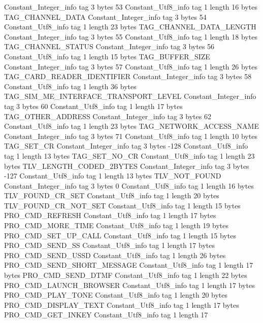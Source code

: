 {{{		}
		Constant_Integer_info {
			tag	3
			bytes	53
		}
		Constant_Utf8_info {
			tag	1
			length	16
			bytes	TAG_CHANNEL_DATA
		}
		Constant_Integer_info {
			tag	3
			bytes	54
		}
		Constant_Utf8_info {
			tag	1
			length	23
			bytes	TAG_CHANNEL_DATA_LENGTH
		}
		Constant_Integer_info {
			tag	3
			bytes	55
		}
		Constant_Utf8_info {
			tag	1
			length	18
			bytes	TAG_CHANNEL_STATUS
		}
		Constant_Integer_info {
			tag	3
			bytes	56
		}
		Constant_Utf8_info {
			tag	1
			length	15
			bytes	TAG_BUFFER_SIZE
		}
		Constant_Integer_info {
			tag	3
			bytes	57
		}
		Constant_Utf8_info {
			tag	1
			length	26
			bytes	TAG_CARD_READER_IDENTIFIER
		}
		Constant_Integer_info {
			tag	3
			bytes	58
		}
		Constant_Utf8_info {
			tag	1
			length	36
			bytes	TAG_SIM_ME_INTERFACE_TRANSPORT_LEVEL
		}
		Constant_Integer_info {
			tag	3
			bytes	60
		}
		Constant_Utf8_info {
			tag	1
			length	17
			bytes	TAG_OTHER_ADDRESS
		}
		Constant_Integer_info {
			tag	3
			bytes	62
		}
		Constant_Utf8_info {
			tag	1
			length	23
			bytes	TAG_NETWORK_ACCESS_NAME
		}
		Constant_Integer_info {
			tag	3
			bytes	71
		}
		Constant_Utf8_info {
			tag	1
			length	10
			bytes	TAG_SET_CR
		}
		Constant_Integer_info {
			tag	3
			bytes	-128
		}
		Constant_Utf8_info {
			tag	1
			length	13
			bytes	TAG_SET_NO_CR
		}
		Constant_Utf8_info {
			tag	1
			length	23
			bytes	TLV_LENGTH_CODED_2BYTES
		}
		Constant_Integer_info {
			tag	3
			bytes	-127
		}
		Constant_Utf8_info {
			tag	1
			length	13
			bytes	TLV_NOT_FOUND
		}
		Constant_Integer_info {
			tag	3
			bytes	0
		}
		Constant_Utf8_info {
			tag	1
			length	16
			bytes	TLV_FOUND_CR_SET
		}
		Constant_Utf8_info {
			tag	1
			length	20
			bytes	TLV_FOUND_CR_NOT_SET
		}
		Constant_Utf8_info {
			tag	1
			length	15
			bytes	PRO_CMD_REFRESH
		}
		Constant_Utf8_info {
			tag	1
			length	17
			bytes	PRO_CMD_MORE_TIME
		}
		Constant_Utf8_info {
			tag	1
			length	19
			bytes	PRO_CMD_SET_UP_CALL
		}
		Constant_Utf8_info {
			tag	1
			length	15
			bytes	PRO_CMD_SEND_SS
		}
		Constant_Utf8_info {
			tag	1
			length	17
			bytes	PRO_CMD_SEND_USSD
		}
		Constant_Utf8_info {
			tag	1
			length	26
			bytes	PRO_CMD_SEND_SHORT_MESSAGE
		}
		Constant_Utf8_info {
			tag	1
			length	17
			bytes	PRO_CMD_SEND_DTMF
		}
		Constant_Utf8_info {
			tag	1
			length	22
			bytes	PRO_CMD_LAUNCH_BROWSER
		}
		Constant_Utf8_info {
			tag	1
			length	17
			bytes	PRO_CMD_PLAY_TONE
		}
		Constant_Utf8_info {
			tag	1
			length	20
			bytes	PRO_CMD_DISPLAY_TEXT
		}
		Constant_Utf8_info {
			tag	1
			length	17
			bytes	PRO_CMD_GET_INKEY
		}
		Constant_Utf8_info {
			tag	1
			length	17
}}}
